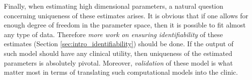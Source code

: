 Finally, when estimating high dimensional parameters, a natural question
concerning uniqueness of these estimates arises. It is obvious that if one allows for
enough degree of freedom in the parameter space, then it is possible
to fit almost any type of data. Therefore \emph{more work on ensuring
identifiability} of these estimates (Section
\ref{sec:intro_identifiability}) should be done. If the output of such
model should have any clinical utility, then uniqueness of the
estimated parameters is absolutely pivotal. Moreover, \emph{validation} of
these model is what matter most in terms of translating such computational
models into the clinic.






